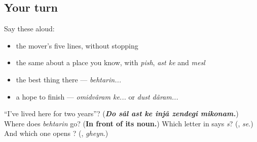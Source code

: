\subsection*{Your turn}
Say these aloud:

\begin{itemize}
\raggedright
  \item the mover's five lines, without stopping
  \item the same about a place you know, with \emph{pish}, \emph{ast ke} and \emph{mesl}
  \item the best thing there — \emph{behtarin...}
  \item a hope to finish — \emph{omidvâram ke...} or \emph{dust dâram...}
\end{itemize}

\begin{tcolorbox}[breakable,colback=teal!4,colframe=teal!35!black,title={Before you move on}]
\textquotedblleft{}I've lived here for two years\textquotedblright{}? (\emph{\textbf{Do sâl ast ke injâ zendegi mikonam.}}) Where does \emph{behtarin} go? (\textbf{In front of its noun.}) Which letter in \textbf{} says \emph{s}? (\textbf{}, \emph{se}.) And which one opens \textbf{}? (\textbf{}, \emph{gheyn}.)
\end{tcolorbox}
